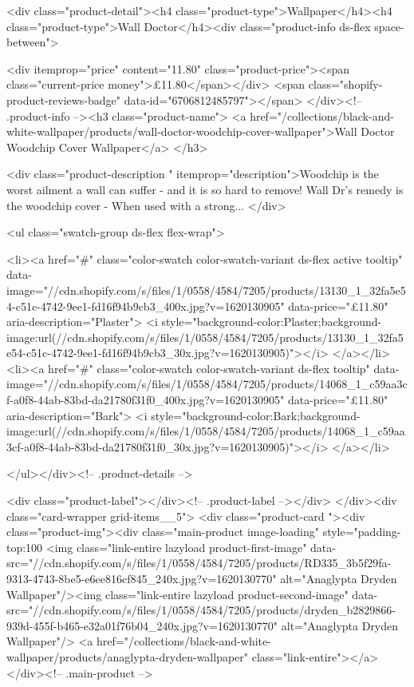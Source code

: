 {{{{{{{<div class="product-detail"><h4 class="product-type">Wallpaper</h4><h4 class="product-type">Wall Doctor</h4><div class="product-info ds-flex space-between">
    
<div itemprop="price" content="11.80" class="product-price"><span class="current-price money">£11.80</span></div>
    <span class="shopify-product-reviews-badge" data-id="6706812485797"></span>
  </div><!-- .product-info --><h3 class="product-name">
      <a href="/collections/black-and-white-wallpaper/products/wall-doctor-woodchip-cover-wallpaper">Wall Doctor Woodchip Cover Wallpaper</a>
    </h3>
    
<div class="product-description " itemprop="description">Woodchip is the worst ailment a wall can suffer - and it is so hard to remove! Wall Dr's remedy is the woodchip cover - When used with a strong...
</div>



<ul class="swatch-group ds-flex flex-wrap">
        
<li><a href="#" class="color-swatch color-swatch-variant ds-flex active tooltip" data-image="//cdn.shopify.com/s/files/1/0558/4584/7205/products/13130_1_32fa5e54-c51c-4742-9ee1-fd16f94b9cb3_400x.jpg?v=1620130905" data-price="£11.80" aria-description="Plaster">
              <i style="background-color:Plaster;background-image:url(//cdn.shopify.com/s/files/1/0558/4584/7205/products/13130_1_32fa5e54-c51c-4742-9ee1-fd16f94b9cb3_30x.jpg?v=1620130905)"></i>
            </a></li>
<li><a href="#" class="color-swatch color-swatch-variant ds-flex tooltip" data-image="//cdn.shopify.com/s/files/1/0558/4584/7205/products/14068_1_c59aa3cf-a0f8-44ab-83bd-da21780f31f0_400x.jpg?v=1620130905" data-price="£11.80" aria-description="Bark">
              <i style="background-color:Bark;background-image:url(//cdn.shopify.com/s/files/1/0558/4584/7205/products/14068_1_c59aa3cf-a0f8-44ab-83bd-da21780f31f0_30x.jpg?v=1620130905)"></i>
            </a></li>

      </ul></div><!-- .product-details -->

<div class="product-label"></div><!-- .product-label --></div>
          </div><div class="card-wrapper grid-items__5">
            <div class="product-card "><div class="product-img"><div class="main-product image-loading" style="padding-top:100%
      <img class="link-entire lazyload product-first-image" data-src="//cdn.shopify.com/s/files/1/0558/4584/7205/products/RD335_3b5f29fa-9313-4743-8be5-e6ee816cf845_240x.jpg?v=1620130770" alt="Anaglypta Dryden Wallpaper"/><img class="link-entire lazyload product-second-image" data-src="//cdn.shopify.com/s/files/1/0558/4584/7205/products/dryden_b2829866-939d-455f-b465-e32a01f76b04_240x.jpg?v=1620130770" alt="Anaglypta Dryden Wallpaper"/>
      <a href="/collections/black-and-white-wallpaper/products/anaglypta-dryden-wallpaper" class="link-entire"></a>
    </div><!-- .main-product -->
  
}}}}}}}

